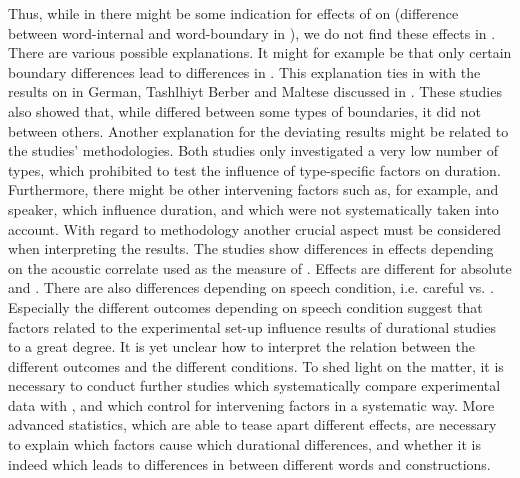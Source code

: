 Thus, while in \cite{Oh.2012} there might be some indication for effects of  on  (difference between word-internal and word-boundary  in ), we do not find these effects in \cite{Oh.2013}. There are various possible explanations. 
It might for example be that only certain boundary differences lead to differences in . This explanation ties in with the results on  in German, Tashlhiyt Berber and Maltese discussed in . These studies also showed that, while  differed between some types of boundaries, it did not between others. 
Another explanation for the deviating results might be related to the studies' methodologies.  
Both studies only investigated a very low number of types, which prohibited to test the influence of type-specific factors on duration. Furthermore, there might be other intervening factors such as, for example,  and speaker, which influence duration, and which were not systematically  taken into account. 
With regard to methodology another crucial aspect must be considered when interpreting the results.
The studies show differences in effects depending on the acoustic correlate used as the measure of . Effects are different for absolute and . There are also differences depending on speech condition, i.e. careful vs. . 
Especially the different outcomes depending on speech condition suggest that factors related to the experimental set-up influence results of durational studies to a great degree. It is yet unclear how to interpret the relation between the different outcomes and the different conditions.
To shed light on the matter, it is necessary to conduct further studies which systematically compare experimental data with , and which control for intervening factors in a systematic way. More advanced statistics, which are able to tease apart different effects, are necessary to explain which factors cause which durational differences, and whether it is indeed  which leads to differences in  between different words and constructions.



